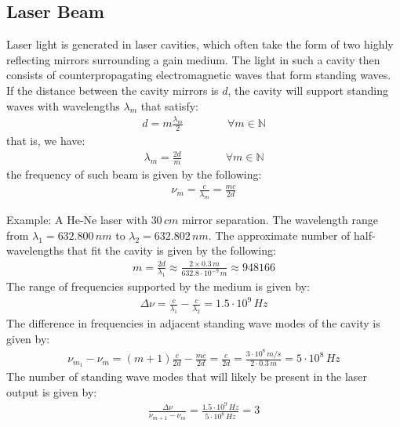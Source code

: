 \documentclass[11pt]{book}
\theoremstyle{break}
\theoremstyle{break}
\newcommand{\N}{\mathbb{N}}
\newcommand{\example}{\color{green}Example: \color{black}}
\begin{document}
\subsection*{Laser Beam}
Laser light is generated in laser cavities, which often take the form of two
highly reflecting mirrors surrounding a gain medium. The light in such a cavity
then consists of counterpropagating electromagnetic waves that form standing
waves. If the distance between the cavity mirrors is $d$, the cavity will support standing waves with wavelengths $\lambda_m$ that satisfy:
\begin{align*}
d = m\frac{\lambda_m}{2} \qquad\qquad \forall	 m \in \N
\end{align*}
that is, we have:
\begin{align*}
\lambda_m = \frac{2d}{m}\qquad\qquad\forall  m\in \N
\end{align*}
the frequency of such beam is given by the following:
\begin{align*}
\nu_m = \frac{c}{\lambda_m} = \frac{mc}{2d}
\end{align*}

\example A He-Ne laser with $30\, cm$ mirror separation. The wavelength range from $\lambda_1 = 632.800\,nm$ to $\lambda_2 = 632.802\, nm$. The approximate number of half-wavelengths that fit the cavity is given by the following:
\begin{align*}
m = \frac{2d}{\lambda_1} \approx \frac{2\times 0.3\, m}{632.8\cdot 10^{-9}\, m} \approx 948166
\end{align*}
The range of frequencies supported by the medium is given by:
\begin{align*}
\Delta \nu = \frac{c}{\lambda_1}  - \frac{c}{\lambda_2} = 1.5\cdot 10^9 \, Hz
\end{align*}
The difference in frequencies in adjacent standing wave modes of the cavity is given by:
\begin{align*}
\nu_{m_1} - \nu_m = (m+1) \frac{c}{2d} -  \frac{mc}{2d} = \frac{c}{2d} = \frac{3\cdot 10^8\, m/s}{2\cdot 0.3\, m} = 5\cdot 10^{8}\, Hz
\end{align*}
The number of standing wave modes that will likely be present in the laser output is given by:
\begin{align*}
\frac{\Delta \nu }{\nu_{m+1} - \nu_m} = \frac{1.5\cdot 10^9 \, Hz}{5\cdot 10^8\, Hz} = 3
\end{align*}
\end{document}
